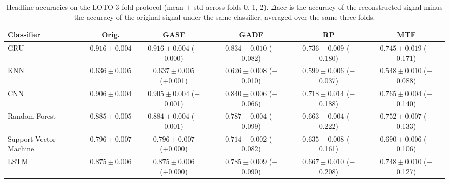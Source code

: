 \begin{table}[H]
\centering
\caption{Headline accuracies on the LOTO 3-fold protocol (mean $\pm$ std across folds 0, 1, 2). $\Delta$acc is the accuracy of the reconstructed signal minus the accuracy of the original signal under the same classifier, averaged over the same three folds.}
\label{tab:gadf_summary}
\setlength{\tabcolsep}{3pt}
\footnotesize
\begin{tabular}{lccccc}
\toprule
\textbf{Classifier} & \textbf{Orig.} & \textbf{GASF} & \textbf{GADF} & \textbf{RP} & \textbf{MTF} \\
\midrule
GRU & $0.916 \pm 0.004$ & $0.916 \pm 0.004$ ($-$0.000) & $0.834 \pm 0.010$ ($-$0.082) & $0.736 \pm 0.009$ ($-$0.180) & $0.745 \pm 0.019$ ($-$0.171) \\
KNN & $0.636 \pm 0.005$ & $0.637 \pm 0.005$ (+0.001) & $0.626 \pm 0.008$ ($-$0.010) & $0.599 \pm 0.006$ ($-$0.037) & $0.548 \pm 0.010$ ($-$0.088) \\
CNN & $0.906 \pm 0.004$ & $0.905 \pm 0.004$ ($-$0.001) & $0.840 \pm 0.006$ ($-$0.066) & $0.718 \pm 0.014$ ($-$0.188) & $0.765 \pm 0.004$ ($-$0.140) \\
Random Forest & $0.885 \pm 0.005$ & $0.884 \pm 0.004$ ($-$0.001) & $0.787 \pm 0.004$ ($-$0.099) & $0.663 \pm 0.004$ ($-$0.222) & $0.752 \pm 0.007$ ($-$0.133) \\
Support Vector Machine & $0.796 \pm 0.007$ & $0.796 \pm 0.007$ (+0.000) & $0.714 \pm 0.002$ ($-$0.082) & $0.635 \pm 0.008$ ($-$0.161) & $0.690 \pm 0.006$ ($-$0.106) \\
LSTM & $0.875 \pm 0.006$ & $0.875 \pm 0.006$ (+0.000) & $0.785 \pm 0.009$ ($-$0.090) & $0.667 \pm 0.010$ ($-$0.208) & $0.748 \pm 0.010$ ($-$0.127) \\
\bottomrule
\end{tabular}
\end{table}


